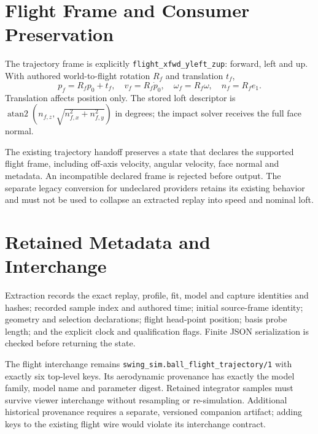 \documentclass[11pt]{article}
\newcommand{\code}[1]{\nolinkurl{#1}}
\begin{document}
\newpage
\section*{Flight Frame and Consumer Preservation}
The trajectory frame is explicitly \code{flight_xfwd_yleft_zup}: forward,
left and up. With authored world-to-flight rotation $R_f$ and translation $t_f$,
\[
 p_f=R_fp_0+t_f,\quad v_f=R_f\dot p_0,\quad
 \omega_f=R_f\omega,\quad n_f=R_fe_1.
\]
Translation affects position only. The stored loft descriptor is
$\operatorname{atan2}(n_{f,z},\sqrt{n_{f,x}^2+n_{f,y}^2})$ in degrees;
the impact solver receives the full face normal.

The existing trajectory handoff preserves a state that declares the supported
flight frame, including off-axis velocity, angular velocity, face normal and
metadata. An incompatible declared frame is rejected before output. The separate
legacy conversion for undeclared providers retains its existing behavior and
must not be used to collapse an extracted replay into speed and nominal loft.

\section*{Retained Metadata and Interchange}
Extraction records the exact replay, profile, fit, model and capture identities
and hashes; recorded sample index and authored time; initial source-frame
identity; geometry and selection declarations; flight head-point position;
basis probe length; and the explicit clock and qualification flags.
Finite JSON serialization is checked before returning the state.

The flight interchange remains \code{swing_sim.ball_flight_trajectory/1} with
exactly six top-level keys. Its aerodynamic provenance has exactly the model
family, model name and parameter digest. Retained integrator samples must survive
viewer interchange without resampling or re-simulation. Additional historical
provenance requires a separate, versioned companion artifact; adding keys to
the existing flight wire would violate its interchange contract.
\end{document}
